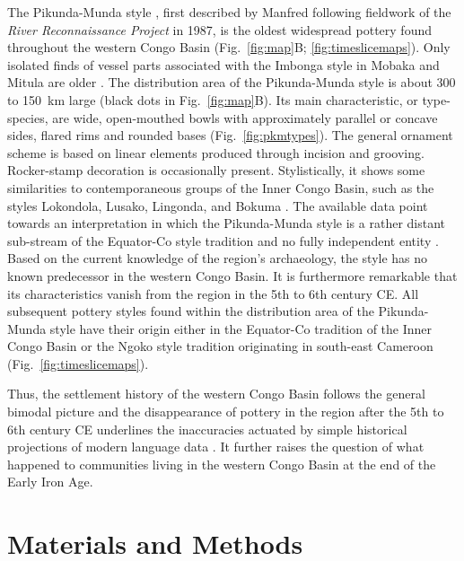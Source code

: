 \documentclass[smallextended,natbib]{svjour3}       %
\begin{document}
The Pikunda-Munda style \cite[114--120]{Seidensticker.2021e}, first described by Manfred \citet{Eggert.1992,Eggert.1993} following fieldwork of the \textit{River Reconnaissance Project} in 1987, is the oldest widespread pottery found throughout the western Congo Basin (Fig.~\ref{fig:map}B; \ref{fig:timeslicemaps}). Only isolated finds of vessel parts associated with the Imbonga style in Mobaka and Mitula are older \cite[Fig.~\ref{fig:map}B;][169--172]{Seidensticker.2021e}. The distribution area of the Pikunda-Munda style is about 300 to 150~km large (black dots in Fig.~\ref{fig:map}B). Its main characteristic, or type-species, are wide, open-mouthed bowls with approximately parallel or concave sides, flared rims and rounded bases (Fig.~\ref{fig:pkmtypes}). The general ornament scheme is based on linear elements produced through incision and grooving. Rocker-stamp decoration is occasionally present. Stylistically, it shows some similarities to contemporaneous groups of the Inner Congo Basin, such as the styles Lokondola, Lusako, Lingonda, and Bokuma \citep[107]{Wotzka.1995}. The available data point towards an interpretation in which the Pikunda-Munda style is a rather distant sub-stream of the Equator-Co style tradition and no fully independent entity \citep[192]{Seidensticker.2021e}. Based on the current knowledge of the region's archaeology, the style has no known predecessor in the western Congo Basin. It is furthermore remarkable that its characteristics vanish from the region in the 5th to 6th century CE. All subsequent pottery styles found within the distribution area of the Pikunda-Munda style have their origin either in the Equator-Co tradition of the Inner Congo Basin \citep[222-224 Fig.~4,273]{Wotzka.1995} or the Ngoko style tradition originating in south-east Cameroon \citep[189--192]{Seidensticker.2021e} (Fig.~\ref{fig:timeslicemaps}).

Thus, the settlement history of the western Congo Basin follows the general bimodal picture \citep{Seidensticker.2016b,Seidensticker.2021e,Seidensticker.2024} and the disappearance of pottery in the region after the 5th to 6th century CE underlines the inaccuracies actuated by simple historical projections of modern language data \citep{Grollemund.2015,Bostoen.2015,Koile.2022}. It further raises the question of what happened to communities living in the western Congo Basin at the end of the Early Iron Age.

\section{Materials and Methods}\label{materials}
\end{document}
